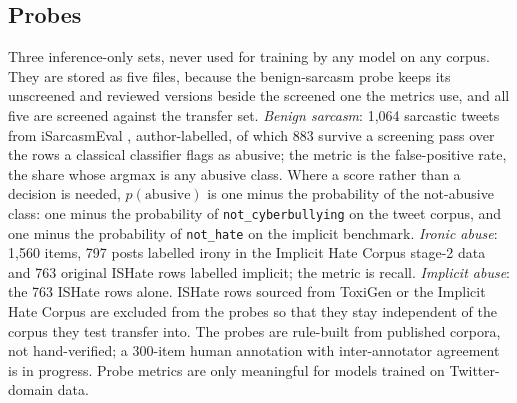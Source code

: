\subsection{Probes}
\label{sec:4.3}
Three inference-only sets, never used for training by any model on any corpus. They are stored as
five files, because the benign-sarcasm probe keeps its unscreened and reviewed versions beside the
screened one the metrics use, and all five are screened against the transfer set. \emph{Benign
sarcasm}: 1,064 sarcastic tweets from iSarcasmEval \cite{abufarha2022semeval, oprea2020isarcasm},
author-labelled, of which 883 survive a screening pass over the rows a classical classifier flags as
abusive; the metric is the false-positive rate, the share whose argmax is any abusive class. Where a
score rather than a decision is needed, $p(\text{abusive})$ is one minus the probability of the
not-abusive class: one minus the probability of \texttt{not\_cyberbullying} on the tweet corpus, and
one minus the probability of \texttt{not\_hate} on the implicit benchmark. \emph{Ironic abuse}:
1,560 items, 797 posts labelled irony in the Implicit Hate Corpus stage-2 data and 763 original
ISHate rows labelled implicit; the metric is recall. \emph{Implicit abuse}: the 763 ISHate rows
alone. ISHate rows sourced from ToxiGen or the Implicit Hate Corpus are excluded from the probes so
that they stay independent of the corpus they test transfer into. The probes are rule-built from
published corpora, not hand-verified; a 300-item human annotation with inter-annotator agreement
\cite{fleiss1971measuring} is in progress. Probe metrics are only meaningful for models trained on
Twitter-domain data.
